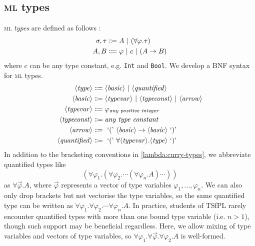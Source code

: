 \subsection{\textsc{ml} types}
\textsc{ml} \textit{types} are defined as follows \cite{van-bakel:2022}:
\begin{align*}
    \sigma, \tau &\Coloneqq A \ |\  (\forall \varphi. \tau) \\
    A, B &\Coloneqq \varphi \ |\  c \ |\  (A \rightarrow B)
\end{align*}
where $c$ can be any type constant, e.g. \texttt{Int} and \texttt{Bool}. We develop a BNF syntax for \textsc{ml} types.
\begin{align*}
    \langle\mathit{type}\rangle &\Coloneqq \langle\mathit{basic}\rangle \ |\  \langle\mathit{quantified}\rangle \\
    \langle\mathit{basic}\rangle &\Coloneqq \langle\mathit{typevar}\rangle \ |\  \langle\mathit{typeconst}\rangle \ |\  \langle\mathit{arrow}\rangle \\
    \langle\mathit{typevar}\rangle &\Coloneqq \varphi_{\textit{any positive integer}} \\
    \langle\mathit{typeconst}\rangle &\Coloneqq \textit{any type constant} \\
    \langle\mathit{arrow}\rangle &\Coloneqq \text{ `(' } \langle\mathit{basic}\rangle \rightarrow \langle\mathit{basic}\rangle \text{ `)' } \\
    \langle\mathit{quantified}\rangle &\Coloneqq \text{ `(' } \forall \langle\mathit{typevar}\rangle. \langle\mathit{type}\rangle \text{ `)' }
\end{align*}
In addition to the bracketing conventions in \ref{lambda:curry-types}, we abbreviate quantified types like
\[
    (\forall \varphi_1. (\forall \varphi_2. \cdots (\forall \varphi_n. A) \cdots ))
\]
as $\forall \Vec{\varphi}. A$, where $\Vec{\varphi}$ represents a vector of type variables $\varphi_1, \ldots, \varphi_n$. We can also only drop brackets but not vectorise the type variables, so the same quantified type can be written as $\forall \varphi_1. \forall \varphi_2. \cdots \forall \varphi_n. A$. In practice, students of TSfPL rarely encounter quantified types with more than one bound type variable (i.e. $n > 1$), though such support may be beneficial regardless. Here, we allow mixing of type variables and vectors of type variables, so $\forall \varphi_1. \forall \Vec{\varphi}. \forall \varphi_2. A$ is well-formed.


